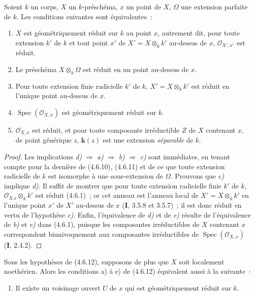 \begin{proposition}[4.6.12]
\label{IV.2.4.6.12-fr}
Soient $k$ un corps, $X$ un $k$-préschéma, $x$ un point de $X$, $\Omega$ une
extension parfaite de $k$. Les conditions suivantes sont équivalentes~:
\begin{enumerate}
\item[\textup{a)}] $X$ est géométriquement réduit sur $k$ au point $x$, autrement dit,
pour toute extension $k'$ de $k$ et tout point $x'$ de
$X'=X\otimes_k k'$ au-dessus de $x$, $\mathcal O_{X',x'}$ est réduit.
\item[\textup{b)}] Le préschéma $X\otimes_k\Omega$ est réduit en un point au-dessus de
$x$.
\item[\textup{c)}] Pour toute extension finie radicielle $k'$ de $k$,
$X'=X\otimes_k k'$ est réduit en l'unique point au-dessus de $x$.
\item[\textup{d)}] $\operatorname{Spec}(\mathcal O_{X,x})$ est géométriquement réduit
sur $k$.
\item[\textup{e)}] $\mathcal O_{X,x}$ est réduit, et pour toute composante irréductible
$Z$ de $X$ contenant $x$, de point générique $z$, $\boldsymbol{k}(z)$ est une extension
\emph{séparable} de $k$.
\end{enumerate}
\end{proposition}

\begin{proof}
Les implications \emph{d)} $\Rightarrow$ \emph{a)} $\Rightarrow$ \emph{b)} $\Rightarrow$ \emph{c)} sont
immédiates, en tenant compte pour la dernière de (4.6.10), (4.6.11) et de ce
que toute extension radicielle de $k$ est isomorphe à une sous-extension de
$\Omega$. Prouvons que \emph{c)} implique \emph{d)}. Il suffit de montrer que pour toute
extension radicielle finie $k'$ de $k$, $\mathcal O_{X\,x}\otimes_k k'$ est
réduit (4.6.1)~; or cet anneau est l'anneau local de $X'=X\otimes_k k'$ en
l'unique point $x'$ de $X'$ au-dessus de $x$ (\textbf{I}, 3.5.8 et 3.5.7)~; il est donc
réduit en vertu de l'hypothèse \emph{c)}. Enfin, l'équivalence de \emph{d)} et de \emph{e)}
résulte de l'équivalence de \emph{b)} et \emph{e)} dans (4.6.1), puisque les composantes
irréductibles de $X$ contenant $x$ correspondent biunivoquement aux composantes
irréductibles de $\operatorname{Spec}(\mathcal O_{X,x})$ (\textbf{I}, 2.4.2).
\end{proof}

\begin{corollary}[4.6.13]
\label{IV.2.4.6.13-fr}
Sous les hypothèses de \textup{(4.6.12)}, supposons de plus que $X$ soit localement
noethérien. Alors les conditions a) à e) de \textup{(4.6.12)} équivalent aussi à la
suivante~:
\begin{enumerate}
\item[\textup{f)}] Il existe un voisinage ouvert $U$ de $x$ qui est géométriquement
réduit sur $k$.
\end{enumerate}
\end{corollary}

